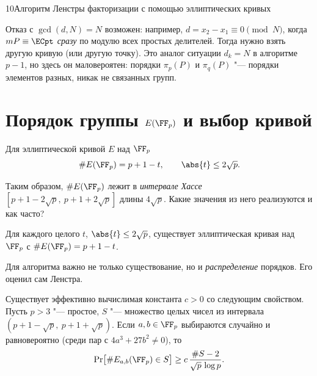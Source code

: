 \begin{lecture}{10}{Алгоритм Ленстры факторизации с помощью эллиптических кривых}

\begin{remark}
Отказ с $\gcd(d, N) = N$ возможен: например, $d = x_2 - x_1 \equiv 0 \pmod N$, когда
$mP \equiv \ECpt$ \emph{сразу} по модулю всех простых делителей. Тогда нужно взять другую
кривую (или другую точку). Это аналог ситуации $d_k = N$ в алгоритме $p - 1$, но здесь он
маловероятен: порядки $\pi_p(P)$ и $\pi_q(P)$ "--- порядки элементов разных, никак не связанных
групп.
\end{remark}



\section{Порядок группы \texorpdfstring{$E(\FF_p)$}{E(F\_p)} и выбор кривой}

\begin{theorem}\label{l10:hasse}
Для эллиптической кривой $E$ над $\FF_p$
\[
  \#E(\FF_p) = p + 1 - t, \qquad \abs{t} \le 2\sqrt{p}.
\]
\end{theorem}

Таким образом, $\#E(\FF_p)$ лежит в \emph{интервале Хассе} $[p + 1 - 2\sqrt p,\ p + 1 + 2\sqrt p]$
длины $4\sqrt p$. Какие значения из него реализуются и как часто?

\begin{theorem}\label{l10:deuring}
Для каждого целого $t$, $\abs{t} \le 2\sqrt p$, существует эллиптическая кривая над $\FF_p$
с $\#E(\FF_p) = p + 1 - t$.
\end{theorem}

Для алгоритма важно не только существование, но и \emph{распределение} порядков. Его оценил
сам Ленстра.

\begin{theorem}\label{l10:distribution}
Существует эффективно вычислимая константа $c > 0$ со следующим свойством. Пусть $p > 3$
"--- простое, $S$ "--- множество целых чисел из интервала $(p + 1 - \sqrt p,\ p + 1 + \sqrt p)$.
Если $a, b \in \FF_p$ выбираются случайно и равновероятно (среди пар с $4a^3 + 27b^2 \ne 0$), то
\[
  \Pr\bigl[\#E_{a,b}(\FF_p) \in S\bigr] \ge c\,\frac{\#S - 2}{\sqrt p \,\log p}.
\]
\end{theorem}


\end{lecture}
